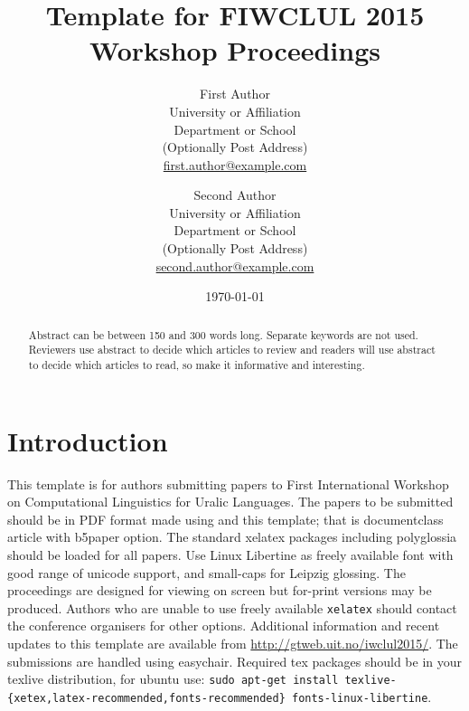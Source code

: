 \documentclass[b5paper]{article}
\begin{document}
\title{Template for FIWCLUL 2015 Workshop Proceedings}

\author{First Author\\
University or Affiliation\\
Department or School\\
(Optionally Post Address)\\
\url{first.author@example.com} \and
Second Author\\
University or Affiliation\\
Department or School\\
(Optionally Post Address)\\
\url{second.author@example.com} 
}

\date{\today}

\maketitle

\begin{abstract}
    Abstract can be between 150 and 300 words long. Separate keywords are not
    used. Reviewers use abstract to decide which articles to review and readers
    will use abstract to decide which articles to read, so make it informative
    and interesting.
\end{abstract}

\section{Introduction}

This template is for authors submitting papers to First International Workshop
on Computational Linguistics for Uralic Languages. The papers to be submitted
should be in PDF format made using \XeLaTeX{} and this template; that is
documentclass article with b5paper option. The standard xelatex packages
including polyglossia should be loaded for all papers.  Use Linux Libertine as
freely available font with good range of unicode support, and small-caps for
Leipzig glossing. The proceedings are designed for viewing on screen but
for-print versions may be produced.  Authors who are unable to use freely
available \texttt{xelatex} should contact the conference organisers for other
options. Additional information and recent updates to this template are
available from \url{http://gtweb.uit.no/iwclul2015/}. The submissions are
handled using easychair. Required tex packages should be in your texlive
distribution, for ubuntu use: \texttt{sudo apt-get install
texlive-\{xetex,latex-recommended,fonts-recommended\} fonts-linux-libertine}.
\end{document}
